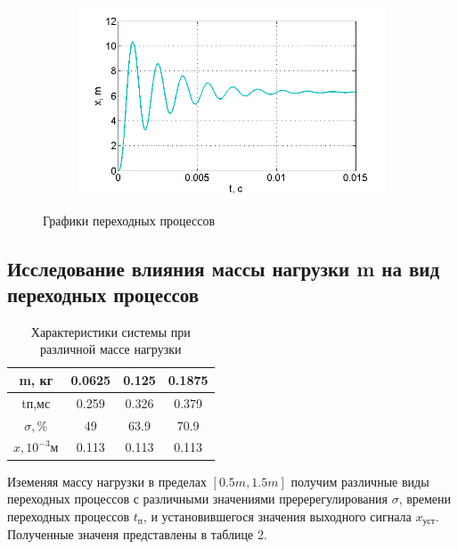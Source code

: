 \documentclass[a4paper, 12pt]{article}
\renewcommand{\arraystretch}{1.5}
\begin{document}
\begin{figure}[h]
\begin{subfigure}{0.5\textwidth}
		\caption{}
		\label{fig:3}
	\end{subfigure}
	\begin{subfigure}{0.5\textwidth}
		\centering
		\includegraphics[width=1.2\linewidth]{4}
		\caption{}
		\label{fig:4}
	\end{subfigure}
\caption{Графики переходных процессов}
\end{figure}

\newpage
\begin{center}
	\section{Исследование влияния массы нагрузки m на вид переходных процессов}
\end{center}\par

	\begin{table}[h!]
		\centering
	\caption{Характеристики системы при различной массе нагрузки }
	\renewcommand{\arraystretch}{1}
	\renewcommand{\tabcolsep}{0.9cm}
	\begin{tabular}{|c|c|c|c|}
		\hline
		m, кг	&	0.0625	&	0.125	&	0.1875		\\
		\hline
		tп,мс	&	0.259	&	0.326	&	0.379		\\
		\hline
		$\sigma, \%$	&	49	&	63.9	&	70.9		\\
		\hline
		$x,10^{-3}м$	&	0.113	&	0.113	&	0.113		\\
		\hline
	\end{tabular}
\end{table}

Иземеняя массу нагрузки в пределах $[0.5m, 1.5m]$ получим различные виды переходных процессов с различными значениями преререгулирования $\sigma$, времени переходных процессов $t_\text{п}$, и установившегося значения выходного сигнала $x_\text{уст}$. Полученные значеня представлены в таблице 2.
\end{document}
